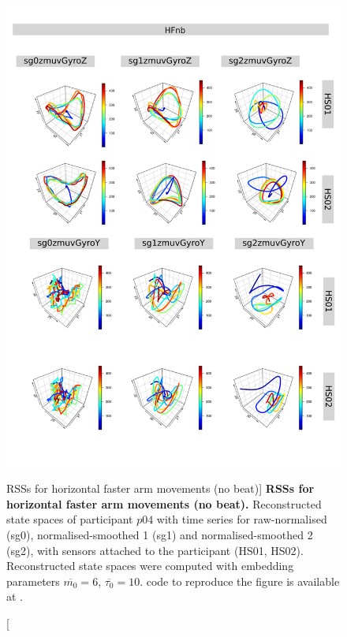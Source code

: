 \begin{figure}
\centering
\includegraphics[height=0.8\textheight]{rss_HFnb_p04}
\caption
	[RSSs for horizontal faster arm movements (no beat)]{
	{\bf RSSs for horizontal faster arm movements (no beat).}
	Reconstructed state spaces of participant $p04$
	with time series for raw-normalised (sg0), 
	normalised-smoothed 1 (sg1) and 
	normalised-smoothed 2 (sg2), 
	with sensors attached to the participant (HS01, HS02).
	Reconstructed state spaces were computed with 
	embedding parameters $\overline{m_0}=6$, $\overline{\tau_0}=10$.
		\R code to reproduce the figure is available at 
		.
        }
     \label{fig:rss_HFnb_p04}
\end{figure}



